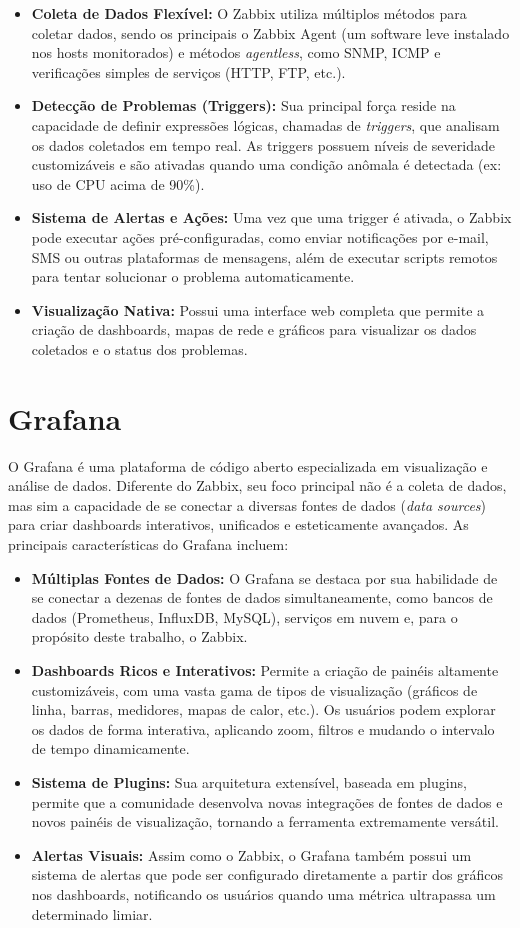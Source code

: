 \begin{itemize}
    \item \textbf{Coleta de Dados Flexível:} O Zabbix utiliza múltiplos métodos para coletar dados, sendo os principais o Zabbix Agent (um software leve instalado nos hosts monitorados) e métodos \textit{agentless}, como SNMP, ICMP e verificações simples de serviços (HTTP, FTP, etc.).
    \item \textbf{Detecção de Problemas (Triggers):} Sua principal força reside na capacidade de definir expressões lógicas, chamadas de \textit{triggers}, que analisam os dados coletados em tempo real. As triggers possuem níveis de severidade customizáveis e são ativadas quando uma condição anômala é detectada (ex: uso de CPU acima de 90\%).
    \item \textbf{Sistema de Alertas e Ações:} Uma vez que uma trigger é ativada, o Zabbix pode executar ações pré-configuradas, como enviar notificações por e-mail, SMS ou outras plataformas de mensagens, além de executar scripts remotos para tentar solucionar o problema automaticamente.
    \item \textbf{Visualização Nativa:} Possui uma interface web completa que permite a criação de dashboards, mapas de rede e gráficos para visualizar os dados coletados e o status dos problemas.
\end{itemize}

\section{Grafana}
O Grafana é uma plataforma de código aberto especializada em visualização e análise de dados. Diferente do Zabbix, seu foco principal não é a coleta de dados, mas sim a capacidade de se conectar a diversas fontes de dados (\textit{data sources}) para criar dashboards interativos, unificados e esteticamente avançados. As principais características do Grafana incluem:

\begin{itemize}
    \item \textbf{Múltiplas Fontes de Dados:} O Grafana se destaca por sua habilidade de se conectar a dezenas de fontes de dados simultaneamente, como bancos de dados (Prometheus, InfluxDB, MySQL), serviços em nuvem e, para o propósito deste trabalho, o Zabbix.
    \item \textbf{Dashboards Ricos e Interativos:} Permite a criação de painéis altamente customizáveis, com uma vasta gama de tipos de visualização (gráficos de linha, barras, medidores, mapas de calor, etc.). Os usuários podem explorar os dados de forma interativa, aplicando zoom, filtros e mudando o intervalo de tempo dinamicamente.
    \item \textbf{Sistema de Plugins:} Sua arquitetura extensível, baseada em plugins, permite que a comunidade desenvolva novas integrações de fontes de dados e novos painéis de visualização, tornando a ferramenta extremamente versátil.
    \item \textbf{Alertas Visuais:} Assim como o Zabbix, o Grafana também possui um sistema de alertas que pode ser configurado diretamente a partir dos gráficos nos dashboards, notificando os usuários quando uma métrica ultrapassa um determinado limiar.
\end{itemize}